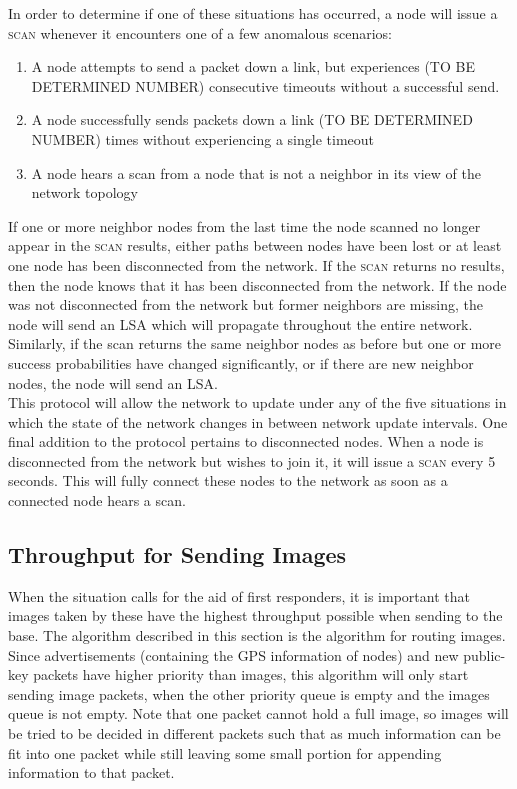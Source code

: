 \documentclass[letterpaper]{article}
\begin{document}
\noindent In order to determine if one of these situations has occurred, a node will issue a 
\textsc{scan} whenever it encounters one of a few anomalous scenarios:

\begin{enumerate}
  \item A node attempts to send a packet down a link, but experiences (TO BE DETERMINED NUMBER) 
  consecutive timeouts without a successful send.
  \item A node successfully sends packets down a link (TO BE DETERMINED NUMBER) times without
  experiencing a single timeout
  \item A node hears a scan from a node that is not a neighbor in its view of the network topology
\end{enumerate}

\noindent If one or more neighbor nodes from the last time the node scanned no longer appear in 
the \textsc{scan} results, either paths between nodes have been lost or at least one node has
been disconnected from the network. If the \textsc{scan} returns no results, then the node knows
that it has been disconnected from the network. If the node was not disconnected from the network
but former neighbors are missing, the node will send an LSA which will propagate throughout the
entire network. Similarly, if the scan returns the same neighbor nodes as before but one or more
success probabilities have changed significantly, or if there are new neighbor nodes, the node will
send an LSA.
\\

\noindent This protocol will allow the network to update under any of the five situations in which
the state of the network changes in between network update intervals. One final addition to the
protocol pertains to disconnected nodes. When a node is disconnected from the network but wishes to
join it, it will issue a \textsc{scan} every 5 seconds. This will fully connect these nodes to the
network as soon as a connected node hears a scan. 

\subsection{Throughput for Sending Images}

When the situation calls for the aid of first responders, it is important that images taken by these have the highest throughput possible when sending to the base. The algorithm described in this section is the algorithm for routing images. Since advertisements (containing the GPS information of nodes) and new public-key packets have higher priority than images, this algorithm will only start sending image packets, when the other priority queue is empty and the images queue is not empty. Note that one packet cannot hold a full image, so images will be tried to be decided in different packets such that as much information can be fit into one packet while still leaving some small portion for appending information to that packet.
\end{document}

